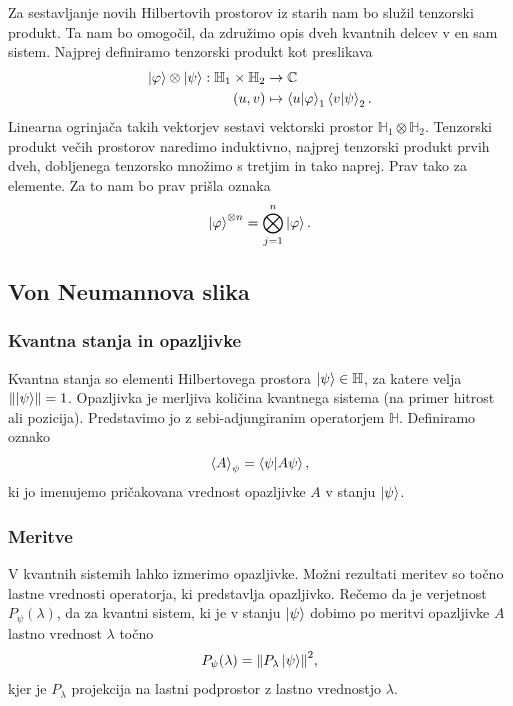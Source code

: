 \documentclass[mat1]{fmfdelo}
\newcommand{\Hb}{\mathbb H}
\begin{document}
Za sestavljanje novih Hilbertovih prostorov iz starih nam bo služil tenzorski produkt. Ta nam bo omogočil, da združimo opis dveh kvantnih delcev v en sam sistem. Najprej definiramo tenzorski produkt kot preslikava
\begin{align*}
    \ket\varphi \otimes \ket\psi : \Hb_1 \times \Hb_2 &\to \mathbb C\\
    (u,v) &\mapsto \braket{u}{\varphi}_1 \braket{v}{\psi}_2.
\end{align*}
Linearna ogrinjača takih vektorjev sestavi vektorski prostor \(\Hb_1 \otimes \Hb_2\). Tenzorski produkt večih prostorov naredimo induktivno, najprej tenzorski produkt prvih dveh, dobljenega tenzorsko množimo s tretjim in tako naprej. Prav tako za elemente. Za to nam bo prav prišla oznaka
\begin{align*}
    \ket{\varphi}^{\otimes n} = \bigotimes_{j=1}^n \ket\varphi.
\end{align*}
\subsection{Von Neumannova slika}
\subsubsection{Kvantna stanja in opazljivke}
Kvantna stanja so elementi Hilbertovega prostora \(\ket\psi\in\Hb\), za katere velja \(\norm{\ket\psi} = 1\). Opazljivka je merljiva količina kvantnega sistema (na primer hitrost ali pozicija). Predstavimo jo z sebi-adjungiranim operatorjem \(\Hb\). Definiramo oznako
\begin{align*}
    \ev{A}_\psi = \braket{\psi}{A\psi},
\end{align*}
ki jo imenujemo pričakovana vrednost opazljivke \(A\) v stanju \(\ket\psi\).
\subsubsection{Meritve}
V kvantnih sistemih lahko izmerimo opazljivke. Možni rezultati meritev so točno lastne vrednosti operatorja, ki predstavlja opazljivko. Rečemo da je verjetnost \(P_\psi(\lambda)\), da za kvantni sistem, ki je v stanju \(\ket\psi\) dobimo po meritvi opazljivke \(A\) lastno vrednost \(\lambda\) točno 
\begin{align*}
    P_\psi(\lambda) = \norm{P_\lambda \ket\psi}^2,
\end{align*}
kjer je \(P_\lambda\) projekcija na lastni podprostor z lastno vrednostjo \(\lambda\).
\end{document}
